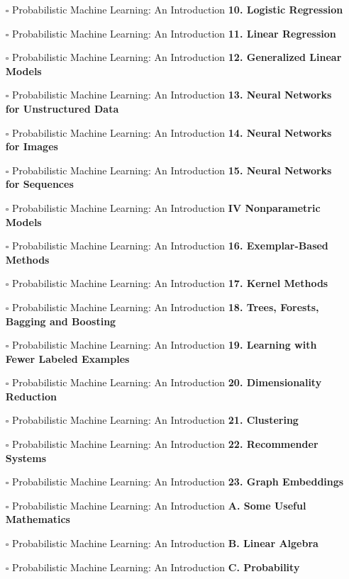 \documentclass[a4, landscape, 12pt]{article}
\newcommand{\checkbox}{$\square$}%
\begin{document}
\begin{itemize}
{}
\item [\checkbox]  Probabilistic Machine Learning: An Introduction \textbf{ 10. Logistic Regression
}
\item [\checkbox]  Probabilistic Machine Learning: An Introduction \textbf{ 11. Linear Regression
}
\item [\checkbox]  Probabilistic Machine Learning: An Introduction \textbf{ 12. Generalized Linear Models
}
\item [\checkbox]  Probabilistic Machine Learning: An Introduction \textbf{ 13. Neural Networks for Unstructured Data
}
\item [\checkbox]  Probabilistic Machine Learning: An Introduction \textbf{ 14. Neural Networks for Images
}
\item [\checkbox]  Probabilistic Machine Learning: An Introduction \textbf{ 15. Neural Networks for Sequences
}
\item [\checkbox]  Probabilistic Machine Learning: An Introduction \textbf{ IV Nonparametric Models
}
\item [\checkbox]  Probabilistic Machine Learning: An Introduction \textbf{ 16. Exemplar-Based Methods
}
\item [\checkbox]  Probabilistic Machine Learning: An Introduction \textbf{ 17. Kernel Methods
}
\item [\checkbox]  Probabilistic Machine Learning: An Introduction \textbf{ 18. Trees, Forests, Bagging and Boosting
}
\item [\checkbox]  Probabilistic Machine Learning: An Introduction \textbf{ 19. Learning with Fewer Labeled Examples
}
\item [\checkbox]  Probabilistic Machine Learning: An Introduction \textbf{ 20. Dimensionality Reduction
}
\item [\checkbox]  Probabilistic Machine Learning: An Introduction \textbf{ 21. Clustering
}
\item [\checkbox]  Probabilistic Machine Learning: An Introduction \textbf{ 22. Recommender Systems
}
\item [\checkbox]  Probabilistic Machine Learning: An Introduction \textbf{ 23. Graph Embeddings
}
\item [\checkbox]  Probabilistic Machine Learning: An Introduction \textbf{ A. Some Useful Mathematics
}
\item [\checkbox]  Probabilistic Machine Learning: An Introduction \textbf{ B. Linear Algebra
}
\item [\checkbox]  Probabilistic Machine Learning: An Introduction \textbf{ C. Probability
}
\end{itemize}
\end{document}
